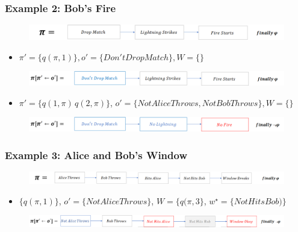 \documentclass{beamer}
\theoremstyle{plain}
\theoremstyle{definition}
\begin{document}
\begin{frame}
\frametitle{Example 2: Bob's Fire}

\begin{figure}
\includegraphics[scale=.28]{bobPlanOriginal}
\end{figure}

\begin{itemize}
\item $\pi'=\{ q(\pi,1)\}, o'=\{Don't Drop Match\}, W=\{\}$
\end{itemize}
\begin{figure}
\includegraphics[scale=.28]{bobPlanCounterfactual}
\end{figure}

\begin{itemize}
\item $\pi'=\{q(1,\pi)\, q(2,\pi)\}$, $o'=\{Not Alice Throws, Not Bob Throws\}, W=\{\}$
\end{itemize}
\begin{figure}
\includegraphics[scale=.28]{bobPlanCounterfactual2}
\end{figure}

\end{frame}


\begin{frame}
\frametitle{Example 3: Alice and Bob's Window}

\begin{figure}
\includegraphics[scale=.28]{aliceBobPlanOriginal}
\end{figure}

\begin{itemize}
\item $\{q(\pi,1) \}$, $o'=\{Not Alice Throws\}$, $W=\{q(\pi, 3\}$, $w^\star=\{ Not Hits Bob)\}$
\end{itemize}
\begin{figure}
\includegraphics[scale=.28]{aliceBobPlanCounterfactual3}
\end{figure}
\end{frame}
\end{document}
